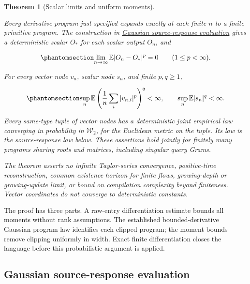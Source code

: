 \documentclass[
  11pt,
]{article}
\theoremstyle{definition}
\theoremstyle{plain}
\newtheorem{theorem}{Theorem}[section]
\theoremstyle{plain}
\theoremstyle{plain}
\theoremstyle{remark}
\begin{document}
\begin{theorem}[Scalar limits and uniform
moments]\protect\hypertarget{thm-mfp-finite-derivative-program}{}\label{thm-mfp-finite-derivative-program}

Every derivative program just specified expands exactly at each finite
\(n\) to a finite primitive program. The construction in
\hyperref[sec-mfp-source-evaluation]{Gaussian source-response
evaluation} gives a deterministic scalar \(O_*\) for each scalar output
\(O_n\), and

\begin{equation}\protect\phantomsection\label{eq-mfp-scalar-lp-limit}{
\lim_{n\to\infty}\mathbb E|O_n-O_*|^p=0
\qquad(1\le p<\infty).
}\end{equation}

For every vector node \(v_n\), scalar node \(s_n\), and finite
\(p,q\ge1\),

\begin{equation}\protect\phantomsection\label{eq-mfp-uniform-node-moments}{
\sup_n\mathbb E\left(\frac1n\sum_i|v_{n,i}|^p\right)^q<\infty,
\qquad \sup_n\mathbb E|s_n|^q<\infty.
}\end{equation}

Every same-type tuple of vector nodes has a deterministic joint
empirical law converging in probability in \(\mathcal W_2\), for the
Euclidean metric on the tuple. Its law is the source-response law below.
These assertions hold jointly for finitely many programs sharing roots
and matrices, including singular query Grams.

The theorem asserts no infinite Taylor-series convergence, positive-time
reconstruction, common existence horizon for finite flows, growing-depth
or growing-update limit, or bound on compilation complexity beyond
finiteness. Vector coordinates do not converge to deterministic
constants.

\end{theorem}

The proof has three parts. A raw-entry differentiation estimate bounds
all moments without rank assumptions. The established bounded-derivative
Gaussian program law identifies each clipped program; the moment bounds
remove clipping uniformly in width. Exact finite differentiation closes
the language before this probabilistic argument is applied.

\subsection{Gaussian source-response
evaluation}\label{sec-mfp-source-evaluation}
\end{document}
